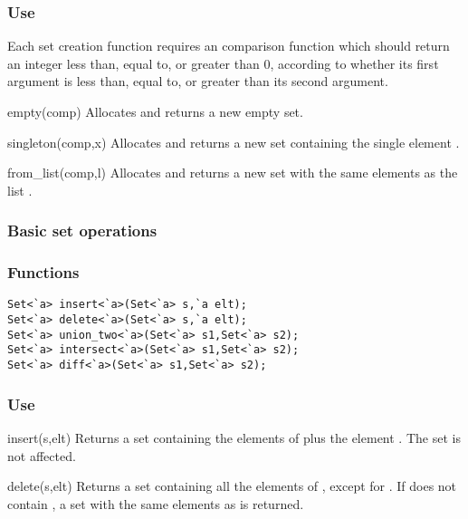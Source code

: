 \subsubsection*{Use}

Each set creation function requires an comparison function 
which should return an integer less than, equal to, or greater than 0,
according to whether its first argument is less than, equal to, or
greater than its second argument.

\begin{defun}{empty}{(comp)}
Allocates and returns a new empty set.
\end{defun}

\begin{defun}{singleton}{(comp,x)}
Allocates and returns a new set containing the single element .
\end{defun}

\begin{defun}{from_list}{(comp,l)}
Allocates and returns a new set with the same elements as the list
.
\end{defun}

\subsubsection*{Basic set operations}
\subsubsection*{Functions}
\begin{verbatim}
Set<`a> insert<`a>(Set<`a> s,`a elt);
Set<`a> delete<`a>(Set<`a> s,`a elt);
Set<`a> union_two<`a>(Set<`a> s1,Set<`a> s2);
Set<`a> intersect<`a>(Set<`a> s1,Set<`a> s2);
Set<`a> diff<`a>(Set<`a> s1,Set<`a> s2);
\end{verbatim}

\subsubsection*{Use}

\begin{defun}{insert}{(s,elt)}
Returns a set containing the elements of  plus the element
.  The set  is not affected.
\end{defun}

\begin{defun}{delete}{(s,elt)}
Returns a set containing all the elements of , except for
.  If  does not contain , a set with the same
elements as  is returned.
\end{defun}

